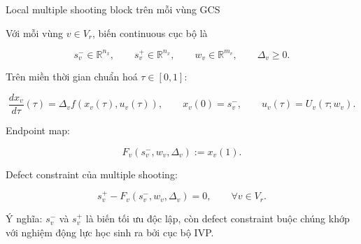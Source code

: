 \documentclass[aspectratio=169]{beamer}
\begin{document}
\begin{frame}{Local multiple shooting block trên mỗi vùng GCS}
    \small

    Với mỗi vùng $v\in V_r$, biến continuous cục bộ là

    \[
        s_v^- \in \mathbb{R}^{n_x},
        \qquad
        s_v^+ \in \mathbb{R}^{n_x},
        \qquad
        w_v\in\mathbb{R}^{m_v},
        \qquad
        \Delta_v\ge 0.
    \]

    Trên miền thời gian chuẩn hoá $\tau\in[0,1]$:

    \[
        \frac{dx_v}{d\tau}(\tau) =
        \Delta_v f(x_v(\tau),u_v(\tau)),
        \qquad
        x_v(0)=s_v^-,
        \qquad
        u_v(\tau)=U_v(\tau;w_v).
    \]

    Endpoint map:

    \[
        F_v(s_v^-,w_v,\Delta_v):=x_v(1).
    \]

    Defect constraint của multiple shooting:

    \[
        s_v^+ - F_v(s_v^-,w_v,\Delta_v)=0,
        \qquad
        \forall v\in V_r.
    \]

    \vspace{0.5em}

    Ý nghĩa: $s_v^-$ và $s_v^+$ là biến tối ưu độc lập, còn defect constraint buộc
    chúng khớp với nghiệm động lực học sinh ra bởi cục bộ IVP.

\end{frame}
\end{document}
